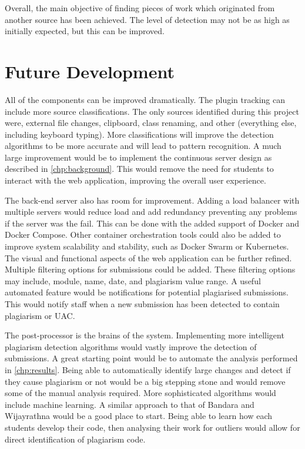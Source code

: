 Overall, the main objective of finding pieces of work which originated from another source has been achieved. The level of detection may not be as high as initially expected, but this can be improved.

\section{Future Development}
\label{sec:future-development}
All of the components can be improved dramatically. The plugin tracking can include more source classifications. The only sources identified during this project were, external file changes, clipboard, class renaming, and other (everything else, including keyboard typing). More classifications will improve the detection algorithms to be more accurate and will lead to pattern recognition. A much large improvement would be to implement the continuous server design as described in \autoref{chp:background}. This would remove the need for students to interact with the web application, improving the overall user experience. 

The back-end server also has room for improvement. Adding a load balancer with multiple servers would reduce load and add redundancy preventing any problems if the server was the fail. This can be done with the added support of Docker and Docker Compose. Other container orchestration tools could also be added to improve system scalability and stability, such as Docker Swarm or Kubernetes. The visual and functional aspects of the web application can be further refined. Multiple filtering options for submissions could be added. These filtering options may include, module, name, date, and plagiarism value range. A useful automated feature would be notifications for potential plagiarised submissions. This would notify staff when a new submission has been detected to contain plagiarism or UAC.

The post-processor is the brains of the system. Implementing more intelligent plagiarism detection algorithms would vastly improve the detection of submissions. A great starting point would be to automate the analysis performed in \autoref{chp:results}. Being able to automatically identify large changes and detect if they cause plagiarism or not would be a big stepping stone and would remove some of the manual analysis required. More sophisticated algorithms would include machine learning. A similar approach to that of Bandara and Wijayrathna would be a good place to start\cite{Bandara2012}. Being able to learn how each students develop their code, then analysing their work for outliers would allow for direct identification of plagiarism code.

